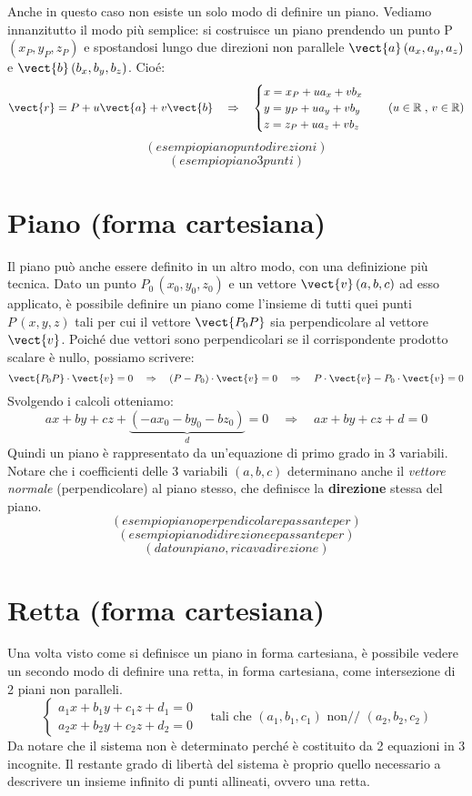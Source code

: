 Anche in questo caso non esiste un solo modo di definire un piano. Vediamo innanzitutto il modo più semplice: si costruisce un piano prendendo un punto P\,$(x_P,y_P,z_P)$ e spostandosi lungo due direzioni non parallele $\vect{a}\,(a_x,a_y,a_z)$ e $\vect{b}\,(b_x,b_y,b_z)$. Cioé:
\[\vect{r} = P+u \vect{a}+v \vect{b} \quad \Rightarrow \quad \begin{cases}
x = x_P+u a_x+v b_x \\
y = y_P+u a_y+v b_y \\
z = z_P+u a_z+v b_z
\end{cases} \quad (u \in \mathbb{R}\;,\, v \in \mathbb{R})\]
\[(esempio piano punto direzioni)\]
\[(esempio piano 3 punti)\]

\section{Piano (forma cartesiana)}
Il piano può anche essere definito in un altro modo, con una definizione più tecnica. Dato un punto $P_0\,(x_0,y_0,z_0)$ e un vettore $\vect{v}\,(a,b,c)$ ad esso applicato, è possibile definire un piano come l'insieme di tutti quei punti $P\,(x,y,z)$ tali per cui il vettore $\vect{P_0P}$ sia perpendicolare al vettore $\vect{v}$. Poiché due vettori sono perpendicolari se il corrispondente prodotto scalare è nullo, possiamo scrivere:
\[\vect{P_0P} \cdot \vect{v} =0 \quad \Rightarrow \quad (P-P_0)\cdot \vect{v}=0 \quad \Rightarrow \quad P \cdot \vect{v}-P_0\cdot \vect{v}=0\]
Svolgendo i calcoli otteniamo:
\[ a x+by+cz + \underbrace{(-a x_0-by_0-bz_0)}_{d}=0 \quad \Rightarrow \quad ax+by+cz+d=0\]
Quindi un piano è rappresentato da un'equazione di primo grado in 3 variabili. Notare che i coefficienti delle 3 variabili $(a,b,c)$ determinano anche il \emph{vettore normale} (perpendicolare) al piano stesso, che definisce la \textbf{direzione} stessa del piano. 
\[(esempio piano perpendicolare passante per)\]
\[(esempio piano di direzione e passante per)\]
\[(dato un piano, ricava direzione)\]

\section{Retta (forma cartesiana)}

Una volta visto come si definisce un piano in forma cartesiana, è possibile vedere un secondo modo di definire una retta, in forma cartesiana, come intersezione di 2 piani non paralleli.
\[\begin{cases}
a_1 x+b_1y+c_1 z+d_1 = 0 \\
a_2 x+b_2y+c_2 z+d_2 = 0
\end{cases} \quad \text{tali che } (a_1,b_1,c_1) \text{ non// } (a_2,b_2,c_2)\]
Da notare che il sistema non è determinato perché è costituito da 2 equazioni in 3 incognite. Il restante grado di libertà del sistema è proprio quello necessario a descrivere un insieme infinito di punti allineati, ovvero una retta.

